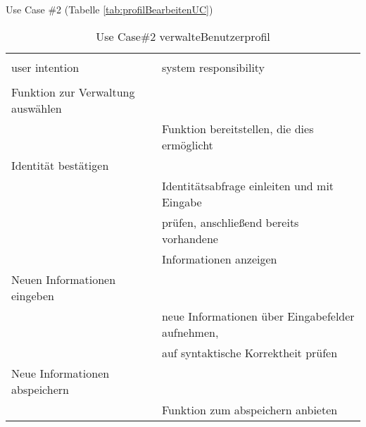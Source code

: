 Use Case \#2 (Tabelle \ref{tab:profilBearbeitenUC})
\begin{table}[H]
\caption{Use Case\#2 verwalteBenutzerprofil }
\centering
\begin{tabular}{l l}
\\ [-0.5ex]

\hline\hline
\\ [-0.5ex]
user intention & system responsibility
\\ [1.5ex]
\hline
\\ [-0.5ex]
Funktion zur Verwaltung auswählen   &                                      \\[1ex]
                           & Funktion bereitstellen, die dies ermöglicht      \\[1ex]
Identität bestätigen          &                                      \\[1ex]
                           & Identitätsabfrage einleiten und mit Eingabe      \\[1ex]
                           & prüfen, anschließend bereits vorhandene          \\[1ex] 
                           & Informationen anzeigen                     \\[1ex] 
Neuen Informationen eingeben     &                                      \\[1ex] 
                           & neue Informationen über Eingabefelder aufnehmen,    \\[1ex]
                           & auf syntaktische Korrektheit prüfen           \\[1ex]
Neue Informationen abspeichern      &                                      \\[1ex]
                           & Funktion zum abspeichern anbieten             \\[1ex]
\hline
\end{tabular}
\label{tab:profilbearbeitenUC}
\end{table}


